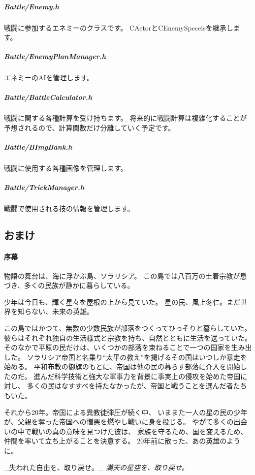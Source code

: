 \subparagraph*{Battle/\+Enemy.\+h}

戦闘に参加するエネミーのクラスです。 C\+Actorと\+C\+Enemy\+Speceisを継承します。

\subparagraph*{Battle/\+Enemy\+Plan\+Manager.\+h}

エネミーの\+A\+Iを管理します。

\subparagraph*{Battle/\+Battle\+Calculator.\+h}

戦闘に関する各種計算を受け持ちます。 将来的に戦闘計算は複雑化することが予想されるので、計算関数だけ分離していく予定です。

\subparagraph*{Battle/\+B\+Img\+Bank.\+h}

戦闘に使用する各種画像を管理します。

\subparagraph*{Battle/\+Trick\+Manager.\+h}

戦闘で使用される技の情報を管理します。

\subsection*{おまけ}

\paragraph*{序幕}

物語の舞台は、海に浮かぶ島、ソラリシア。 この島では八百万の土着宗教が息づき、多くの民族が静かに暮らしている。

少年は今日も、輝く星々を屋根の上から見ていた。 星の民、風上冬仁。まだ世界を知らない、未来の英雄。 

 この島ではかつて、無数の少数民族が部落をつくってひっそりと暮らしていた。 彼らはそれぞれ独自の生活様式と宗教を持ち、自然とともに生活を送っていた。 そのなかで平原の民だけは、いくつかの部落を束ねることで一つの国家を生み出した。 ソラリシア帝国と名乗り“太平の教え”を掲げるその国はいつしか暴走を始める。 平和布教の御旗のもとに、帝国は他の民の暮らす部落に介入を開始したのだ。 進んだ科学技術と強大な軍事力を背景に事実上の侵攻を始めた帝国に対し、 多くの民はなすすべを持たなかったが、帝国と戦うことを選んだ者たちもいた。

それから20年。帝国による異教徒弾圧が続く中、 いままた一人の星の民の少年が、父親を奪った帝国への憎悪を燃やし戦いに身を投じる。 やがて多くの出会いの中で戦いの真の意味を見つけた彼は、 家族を守るため、国を変えるため、仲間を率いて立ち上がることを決意する。 20年前に散った、あの英雄のように。

\begin{center}\+\_\+失われた自由を、取り戻せ。\+\_\+ {\itshape 満天の星空を、取り戻せ。}\end{center}  